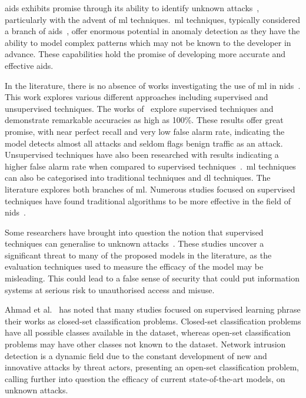 \gls{aids} exhibits promise through its ability to identify unknown
attacks~\cite{aids-unknown}, particularly with the advent of \gls{ml}
techniques.\ \gls{ml} techniques, typically considered a branch of
\gls{aids}~\cite{survey1}, offer enormous potential in anomaly detection as
they have the ability to model complex patterns which may not be known to the
developer in advance. These capabilities hold the promise of developing more
accurate and effective \gls{aids}.

In the literature, there is no absence of works investigating the use of
\gls{ml} in \gls{nids}~\cite{Karatas, Jiang, Mighan, Pu, Cao, Atefinia}. This
work explores various different approaches including supervised and
unsupervised techniques. The works of~\cite{Karatas, Jiang, Mighan, Atefinia}
explore supervised techniques and demonstrate remarkable accuracies as high as
100\%. These results offer great promise, with near perfect recall and very low
false alarm rate, indicating the model detects almost all attacks and seldom
flags benign traffic as an attack. Unsupervised techniques have also been
researched with results indicating a higher false alarm rate when compared to
supervised techniques~\cite{Zoppi}.\ \gls{ml} techniques can also be
categorised into traditional techniques and \gls{dl} techniques. The literature
explores both branches of \gls{ml}. Numerous studies focused on supervised
techniques have found traditional algorithms to be more effective in the field
of \gls{nids}~\cite{Liu, Zoppi}.

Some researchers have brought into question the notion that supervised
techniques can generalise to unknown attacks~\cite{Kus, Zoppi}. These studies
uncover a significant threat to many of the proposed models in the literature,
as the evaluation techniques used to measure the efficacy of the model may be
misleading. This could lead to a false sense of security that could put
information systems at serious risk to unauthorised access and misuse.

Ahmad et al.~\cite{zero-day} has noted that many studies focused on supervised
learning phrase their works as closed-set classification problems. Closed-set
classification problems have all possible classes available in the dataset,
whereas open-set classification problems may have other classes not known to
the dataset. Network intrusion detection is a dynamic field due to the constant
development of new and innovative attacks by threat actors, presenting an
open-set classification problem, calling further into question the efficacy of
current state-of-the-art models, on unknown attacks.

